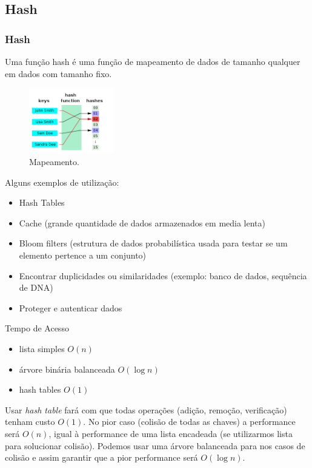 \subsection{Hash}
\begin{frame}
  \frametitle{Hash}

Uma função hash é uma função de mapeamento de dados de tamanho qualquer 
em dados com tamanho fixo.

  \begin{figure}[h!]
  \centering
  \includegraphics[width=0.33\textwidth,height=0.7\textheight,keepaspectratio]{figures/hashkeys.png}
  \caption{Mapeamento.}
  \label{fig:hashkeys}
  \end{figure}

\framebreak

Alguns exemplos de utilização:
\begin{itemize}
\item Hash Tables
\item Cache (grande quantidade de dados armazenados em media lenta)
\item Bloom filters (estrutura de dados probabilística usada para testar se um elemento pertence a um conjunto)
\item Encontrar duplicidades ou similaridades (exemplo: banco de dados, sequência de DNA)
\item Proteger e autenticar dados 
\end{itemize}

\framebreak

Tempo de Acesso
\begin{itemize}
\item lista simples $O(n)$
\item árvore binária balanceada $O(\log n)$
\item hash tables $O(1)$
\end{itemize}

Usar \emph{hash table} fará com que todas operações (adição, remoção, verificação) tenham custo $O(1)$.
No pior caso (colisão de todas as chaves) a performance será $O(n)$, igual à performance
de uma lista encadeada (se utilizarmos lista para solucionar colisão). 
Podemos usar uma árvore balanceada para nos casos de colisão e assim garantir 
que a pior performance será $O(\log n)$.


\end{frame}
